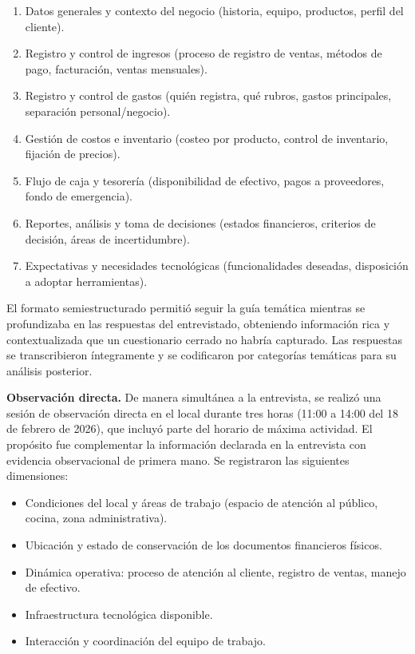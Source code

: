 \documentclass[12pt,letterpaper]{article}
\begin{document}
\begin{enumerate}
  \item Datos generales y contexto del negocio (historia, equipo, productos, perfil del cliente).
  \item Registro y control de ingresos (proceso de registro de ventas, métodos de pago, facturación, ventas mensuales).
  \item Registro y control de gastos (quién registra, qué rubros, gastos principales, separación personal/negocio).
  \item Gestión de costos e inventario (costeo por producto, control de inventario, fijación de precios).
  \item Flujo de caja y tesorería (disponibilidad de efectivo, pagos a proveedores, fondo de emergencia).
  \item Reportes, análisis y toma de decisiones (estados financieros, criterios de decisión, áreas de incertidumbre).
  \item Expectativas y necesidades tecnológicas (funcionalidades deseadas, disposición a adoptar herramientas).
\end{enumerate}

El formato semiestructurado permitió seguir la guía temática mientras se profundizaba en las respuestas del entrevistado, obteniendo información rica y contextualizada que un cuestionario cerrado no habría capturado. Las respuestas se transcribieron íntegramente y se codificaron por categorías temáticas para su análisis posterior.

\textbf{Observación directa.} De manera simultánea a la entrevista, se realizó una sesión de observación directa en el local durante tres horas (11:00 a 14:00 del 18 de febrero de 2026), que incluyó parte del horario de máxima actividad. El propósito fue complementar la información declarada en la entrevista con evidencia observacional de primera mano. Se registraron las siguientes dimensiones:

\begin{itemize}
  \item Condiciones del local y áreas de trabajo (espacio de atención al público, cocina, zona administrativa).
  \item Ubicación y estado de conservación de los documentos financieros físicos.
  \item Dinámica operativa: proceso de atención al cliente, registro de ventas, manejo de efectivo.
  \item Infraestructura tecnológica disponible.
  \item Interacción y coordinación del equipo de trabajo.
\end{itemize}
\end{document}
